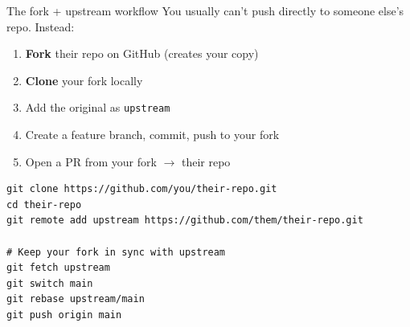 \documentclass[10pt,aspectratio=169]{beamer}
\begin{document}
\begin{frame}[fragile]{The fork + upstream workflow}
  You usually can't push directly to someone else's repo. Instead:

  \begin{enumerate}
    \item \textbf{Fork} their repo on GitHub (creates your copy)
    \item \textbf{Clone} your fork locally
    \item Add the original as \texttt{upstream}
    \item Create a feature branch, commit, push to your fork
    \item Open a PR from your fork $\to$ their repo
  \end{enumerate}

\begin{lstlisting}
git clone https://github.com/you/their-repo.git
cd their-repo
git remote add upstream https://github.com/them/their-repo.git

# Keep your fork in sync with upstream
git fetch upstream
git switch main
git rebase upstream/main
git push origin main
\end{lstlisting}
\end{frame}
\end{document}
